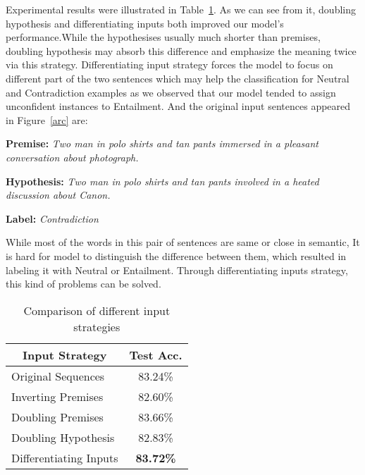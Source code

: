\documentclass[11pt,letterpaper]{article}
\begin{document}
Experimental results were illustrated in Table~\ref{InputSgy}. As we can see from it, doubling hypothesis and differentiating inputs both improved our model's performance.While the hypothesises usually much shorter than premises, doubling hypothesis may absorb this difference and emphasize
the meaning twice via this strategy. Differentiating input strategy forces the model to focus on different part of the two sentences
which may help the classification for Neutral and Contradiction examples as we observed that our model tended to assign unconfident instances to
Entailment. And the original input sentences appeared in Figure~\ref{arc} are:
\begin{small}

\textbf{Premise:} \emph{Two man in polo shirts  and tan pants immersed in a pleasant conversation about photograph.}

\textbf{Hypothesis:} \emph{Two man in polo shirts and tan pants involved in a heated discussion about Canon.}

\textbf{Label:} \emph{Contradiction}

\end{small}
While most of the words in this pair of sentences are same or close in semantic, It is hard for model to distinguish the difference between them, which resulted in labeling it with Neutral or Entailment. Through differentiating inputs strategy, this kind of problems can be solved.
\begin{table}[]
\centering
\begin{tabular}{|l|c|}
\hline
\multicolumn{1}{|c|}{\textbf{Input Strategy}} & \textbf{Test Acc.} \\ \hline
Original Sequences                            & 83.24\%            \\ \hline
Inverting Premises                            & 82.60\%            \\ \hline
Doubling Premises                             & 83.66\%            \\ \hline
Doubling Hypothesis                           & 82.83\%            \\ \hline
Differentiating Inputs                        & \textbf{83.72\%}   \\ \hline
\end{tabular}
\caption{Comparison of different input strategies}
\label{InputSgy}
\end{table}
\end{document}
